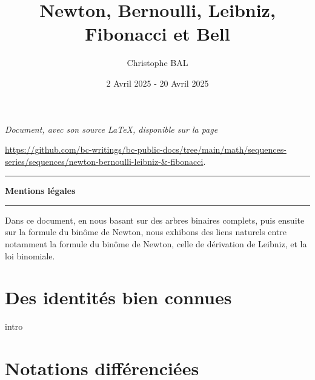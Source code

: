 \documentclass[12pt]{amsart}
\begin{document}
\title{Newton, Bernoulli, Leibniz, Fibonacci et Bell}
\author{Christophe BAL}
\date{2 Avril 2025 - 20 Avril 2025}

\maketitle

\begin{center}
	\itshape
	Document, avec son source \LaTeX, disponible sur la page

	\url{https://github.com/bc-writings/bc-public-docs/tree/main/math/sequences-series/sequences/newton-bernoulli-leibniz-&-fibonacci}.
\end{center}


\bigskip


\begin{center}
	\hrule\vspace{.3em}
	{
		\fontsize{1.35em}{1em}\selectfont
		\textbf{Mentions \og légales \fg}
	}

	\vspace{0.45em}
	\doclicenseThis
	\hrule
\end{center}


\bigskip


\setcounter{tocdepth}{2}
\tableofcontents




\newpage

\begin{meta-abstract*}
	Dans ce document, en nous basant
	sur des arbres binaires complets,
	puis ensuite
	sur la formule du binôme de Newton,
	nous exhibons des liens naturels entre notamment
	la formule du binôme de Newton,
	celle de dérivation de Leibniz,
	et la loi binomiale.
\end{meta-abstract*}




\section{Des identités bien connues} \label{beautiful-id}

{intro}




\section{Notations différenciées}
\end{document}

